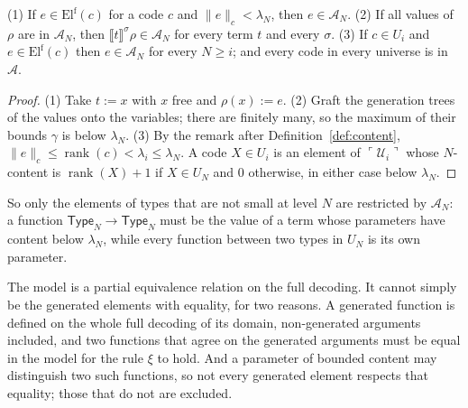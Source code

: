 \documentclass[10pt]{article}
\newcommand{\Type}{\mathsf{Type}}
\newcommand{\rk}{\operatorname{rank}}
\newcommand{\sem}[1]{\llbracket #1\rrbracket}
\newcommand{\El}{\mathrm{El}}
\newcommand{\code}[1]{\ulcorner #1\urcorner}
\newcommand{\U}{\mathcal{U}}
\begin{document}
\begin{lemma}\label{lem:termadm}
(1) If $e\in\El^{\mathrm f}(c)$ for a code $c$ and $\|e\|_c<\lambda_N$,
then $e\in\mathcal A_N$. (2) If all values of $\rho$ are in
$\mathcal A_N$, then $\sem t^\sigma\rho\in\mathcal A_N$ for every term $t$
and every $\sigma$. (3) If $c\in U_i$ and $e\in\El^{\mathrm f}(c)$ then
$e\in\mathcal A_N$ for every $N\ge i$; and every code in every universe
is in $\mathcal A$.
\end{lemma}
\begin{proof}
(1) Take $t:=x$ with $x$ free and $\rho(x):=e$. (2) Graft the generation
trees of the values onto the variables; there are finitely many, so the
maximum of their bounds $\gamma$ is below $\lambda_N$. (3) By the remark
after Definition~\ref{def:content},
$\|e\|_c\le\rk(c)<\lambda_i\le\lambda_N$. A code $X\in U_i$ is an element
of $\code{\U_i}$ whose $N$-content is $\rk(X)+1$ if $X\in U_N$ and $0$
otherwise, in either case below $\lambda_N$.
\end{proof}

So only the elements of types that are not small at level $N$ are
restricted by $\mathcal A_N$: a function $\Type_N\to\Type_N$ must be the
value of a term whose parameters have content below $\lambda_N$, while
every function between two types in $U_N$ is its own parameter.

The model is a partial equivalence relation on the full decoding. It
cannot simply be the generated elements with equality, for two reasons.
A generated function is defined on the whole full decoding of its
domain, non-generated arguments included, and two functions that agree
on the generated arguments must be equal in the model for the rule
$\xi$ to hold. And a parameter of bounded content may distinguish two
such functions, so not every generated element respects that equality;
those that do not are excluded.
\end{document}
